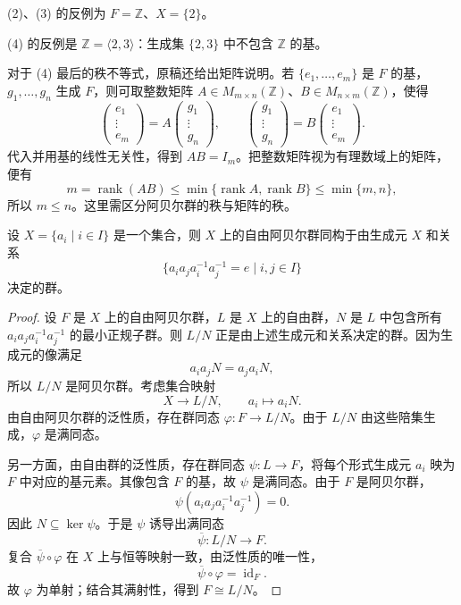 \begin{purplenote}

(2)、(3) 的反例为 $F=\mathbb Z$、$X=\{ 2 \}$。

(4) 的反例是 $\mathbb Z=\langle2,3\rangle$：生成集 $\{2,3\}$ 中不包含 $\mathbb Z$ 的基。

对于 (4) 最后的秩不等式，原稿还给出矩阵说明。若 $\{e_1,\ldots,e_m\}$ 是 $F$ 的基，$g_1,\ldots,g_n$ 生成 $F$，则可取整数矩阵 $A\in M_{m\times n}(\mathbb Z)$、$B\in M_{n\times m}(\mathbb Z)$，使得
\[
  \begin{pmatrix}e_1\\\vdots\\e_m\end{pmatrix}
  =A\begin{pmatrix}g_1\\\vdots\\g_n\end{pmatrix},
  \qquad
  \begin{pmatrix}g_1\\\vdots\\g_n\end{pmatrix}
  =B\begin{pmatrix}e_1\\\vdots\\e_m\end{pmatrix}.
\]
代入并用基的线性无关性，得到 $AB=I_m$。把整数矩阵视为有理数域上的矩阵，便有
\[
  m=\operatorname{rank}(AB)
  \leq\min\{\operatorname{rank}A,\operatorname{rank}B\}
  \leq\min\{m,n\},
\]
所以 $m\leq n$。这里需区分阿贝尔群的秩与矩阵的秩。
\end{purplenote}

\begin{proposition}\label{prop:free-abelian-commutator-presentation}
设 $X=\{a_i\mid i\in I\}$ 是一个集合，则 $X$ 上的自由阿贝尔群同构于由生成元 $X$ 和关系
\[
  \{a_ia_ja_i^{-1}a_j^{-1}=e\mid i,j\in I\}
\]
决定的群。
\end{proposition}

\begin{proof}
设 $F$ 是 $X$ 上的自由阿贝尔群，$L$ 是 $X$ 上的自由群，$N$ 是 $L$ 中包含所有 $a_ia_ja_i^{-1}a_j^{-1}$ 的最小正规子群。则 $L/N$ 正是由上述生成元和关系决定的群。因为生成元的像满足
\[
  a_ia_jN=a_ja_iN,
\]
所以 $L/N$ 是阿贝尔群。考虑集合映射
\[
  X\longrightarrow L/N,\qquad a_i\longmapsto a_iN.
\]
由自由阿贝尔群的泛性质，存在群同态 $\varphi:F\to L/N$。由于 $L/N$ 由这些陪集生成，$\varphi$ 是满同态。

另一方面，由自由群的泛性质，存在群同态 $\psi:L\to F$，将每个形式生成元 $a_i$ 映为 $F$ 中对应的基元素。其像包含 $F$ 的基，故 $\psi$ 是满同态。由于 $F$ 是阿贝尔群，
\[
  \psi(a_ia_ja_i^{-1}a_j^{-1})=0.
\]
因此 $N\subseteq\ker\psi$。于是 $\psi$ 诱导出满同态
\[
  \overline\psi:L/N\longrightarrow F.
\]
复合 $\overline\psi\circ\varphi$ 在 $X$ 上与恒等映射一致，由泛性质的唯一性，
\[
  \overline\psi\circ\varphi=\operatorname{id}_F.
\]
故 $\varphi$ 为单射；结合其满射性，得到 $F\cong L/N$。
\end{proof}

